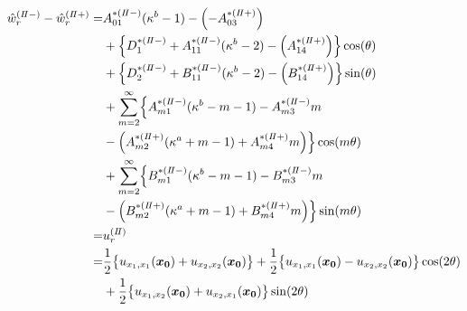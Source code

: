 \begin{align}
	\hat{w}_{r}^{(I\hspace{-.15em}I-)}-\hat{w}_{r}^{(I\hspace{-.15em}I+)} =
	&A_{01}^{*(I\hspace{-.15em}I-)}(\kappa^{b}-1)-\Bigl(-A_{03}^{*(I\hspace{-.15em}I+)}\Bigr)
	\nonumber
	\\
	&+\Bigl\{D_{1}^{*(I\hspace{-.15em}I-)}+A_{11}^{*(I\hspace{-.15em}I-)}(\kappa^{b}-2)
	-\Bigl(A_{14}^{*(I\hspace{-.15em}I+)}\Bigr)\Bigr\}\cos(\theta)
	\nonumber
	\\
	&+\Bigl\{D_{2}^{*(I\hspace{-.15em}I-)}+B_{11}^{*(I\hspace{-.15em}I-)}(\kappa^{b}-2)
	-\Bigl(B_{14}^{*(I\hspace{-.15em}I+)}\Bigr)\Bigr\}\sin(\theta)
	\nonumber
	\\
	&+\sum_{m=2}^{\infty}\Bigl\{A_{m1}^{*(I\hspace{-.15em}I-)}(\kappa^{b}-m-1)
	-A_{m3}^{*(I\hspace{-.15em}I-)}m
	\nonumber
	\\
	&-\Bigl(A_{m2}^{*(I\hspace{-.15em}I+)}(\kappa^{a}+m-1)
	+A_{m4}^{*(I\hspace{-.15em}I+)}m\Bigr)\Bigr\}\cos(m\theta)
	\nonumber
	\\
	&+\sum_{m=2}^{\infty}\Bigl\{B_{m1}^{*(I\hspace{-.15em}I-)}(\kappa^{b}-m-1)
	-B_{m3}^{*(I\hspace{-.15em}I-)}m
	\nonumber
	\\
	&-\Bigl(B_{m2}^{*(I\hspace{-.15em}I+)}(\kappa^{a}+m-1)
	+B_{m4}^{*(I\hspace{-.15em}I+)}m\Bigr)\Bigr\}\sin(m\theta)
	\nonumber
	\\
	=&u_{r}^{(I\hspace{-.15em}I)}
	\nonumber
	\\
	=&\frac{1}{2}\bigl\{u_{x_{1},x_{1}}(\bm{x_{0}})+u_{x_{2},x_{2}}(\bm{x_{0}})\bigr\}
	+\frac{1}{2}\bigl\{u_{x_{1},x_{1}}(\bm{x_{0}})-u_{x_{2},x_{2}}(\bm{x_{0}})\bigr\}\cos(2\theta)
	\nonumber
	\\
	&+\frac{1}{2}\bigl\{u_{x_{1},x_{2}}(\bm{x_{0}})+u_{x_{2},x_{1}}(\bm{x_{0}})\bigr\}\sin(2\theta)
	\label{eq:UR2eq}
\end{align}

